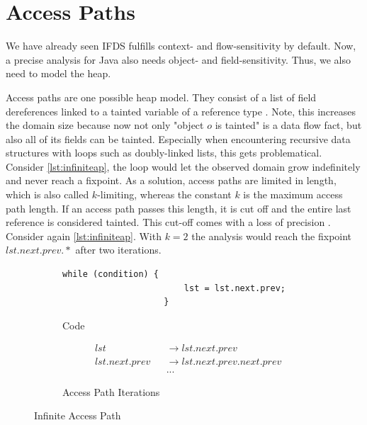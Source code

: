\documentclass[../draft.tex]{subfiles}
\begin{document}
    \section{Access Paths}\label{s:ap}
    We have already seen IFDS fulfills context- and flow-sensitivity by default. 
    Now, a precise analysis for Java also needs object- and field-sensitivity. 
    Thus, we also need to model the heap. 

    Access paths are one possible heap model. 
    They consist of a list of field dereferences linked to a tainted variable of a reference type \cite{Khedker2009}. 
    Note, this increases the domain size because now not only "object $o$ is tainted" is a data flow fact, but also all of its fields can be tainted. 
    Especially when encountering recursive data structures with loops such as doubly-linked lists, this gets problematical. 
    Consider \autoref{lst:infiniteap}, the loop would let the observed domain grow indefinitely and never reach a fixpoint.
    As a solution, access paths are limited in length, which is also called $k$-limiting, whereas the constant $k$ is the maximum access path length. 
    If an access path passes this length, it is cut off and the entire last reference is considered tainted.
    This cut-off comes with a loss of precision \cite{Jones1979}. 
    Consider again \autoref{lst:infiniteap}. 
    With $k=2$ the analysis would reach the fixpoint $lst.next.prev.*$ after two iterations.

    \begin{figure}[ht]
        \centering
        \begin{subfigure}[b]{0.45\textwidth}
            \centering
            \begin{adjustbox}{max width=\columnwidth}
                \begin{lstlisting}[gobble=20]
                    while (condition) {
                        lst = lst.next.prev;
                    }
                \end{lstlisting}
            \end{adjustbox}
            \caption{Code}
        \end{subfigure}
        \qquad
        \begin{subfigure}[b]{0.45\textwidth}
            \centering
            \small
            $$
            \begin{aligned}
                &lst& &\rightarrow lst.next.prev\\
                &lst.next.prev& &\rightarrow lst.next.prev.next.prev\\
                & & &...
            \end{aligned}
            $$
            \normalsize
            \caption{Access Path Iterations}
        \end{subfigure}
        \caption{Infinite Access Path}
        \label{lst:infiniteap}
    \end{figure}
\end{document}
